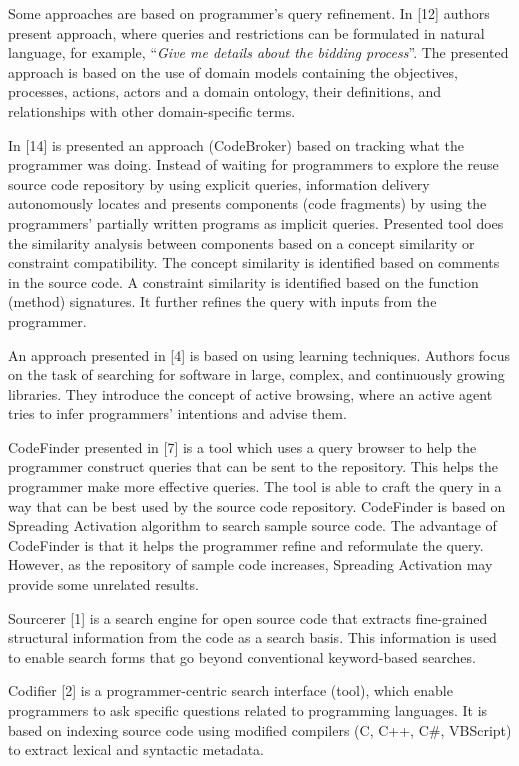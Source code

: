 \documentclass{llncs}
\begin{document}
Some approaches are based on programmer’s query refinement. In [12] authors
present approach, where queries and restrictions can be formulated in natural language,
for example, “\textit{Give me details about the bidding process}”. The presented approach
is based on the use of domain models containing the objectives, processes,
actions, actors and a domain ontology, their definitions, and relationships with other
domain-specific terms.

In [14] is presented an approach (CodeBroker) based on tracking what the programmer
was doing. Instead of waiting for programmers to explore the reuse source
code repository by using explicit queries, information delivery autonomously locates
and presents components (code fragments) by using the programmers’ partially written
programs as implicit queries. Presented tool does the similarity analysis between
components based on a concept similarity or constraint compatibility. The concept
similarity is identified based on comments in the source code. A constraint similarity
is identified based on the function (method) signatures. It further refines the query
with inputs from the programmer.

An approach presented in [4] is based on using learning techniques. Authors focus
on the task of searching for software in large, complex, and continuously growing
libraries. They introduce the concept of active browsing, where an active agent tries to
infer programmers’ intentions and advise them.

CodeFinder presented in [7] is a tool which uses a query browser to help the programmer
construct queries that can be sent to the repository. This helps the programmer
make more effective queries. The tool is able to craft the query in a way that can
be best used by the source code repository. CodeFinder is based on Spreading Activation
algorithm to search sample source code. The advantage of CodeFinder is that it
helps the programmer refine and reformulate the query. However, as the repository of
sample code increases, Spreading Activation may provide some unrelated results.

Sourcerer [1] is a search engine for open source code that extracts fine-grained
structural information from the code as a search basis. This information is used to
enable search forms that go beyond conventional keyword-based searches.

Codifier [2] is a programmer-centric search interface (tool), which enable programmers
to ask specific questions related to programming languages. It is based on
indexing source code using modified compilers (C, C++, C\#, VBScript) to extract
lexical and syntactic metadata.
\end{document}
